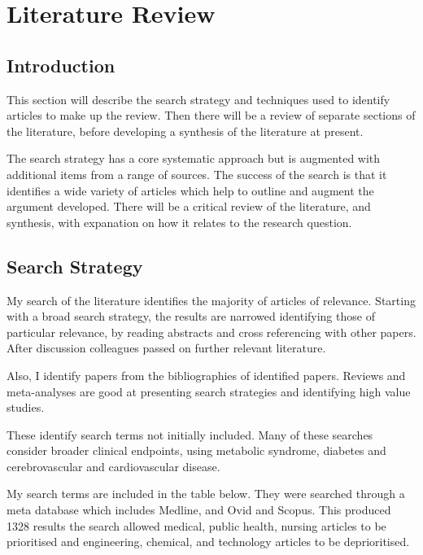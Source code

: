 \documentclass[
]{article}
\begin{document}
\newpage

\hypertarget{literature-review}{%
\section{Literature Review}\label{literature-review}}

\hypertarget{introduction-1}{%
\subsection{Introduction}\label{introduction-1}}

This section will describe the search strategy and techniques used to
identify articles to make up the review. Then there will be a review of
separate sections of the literature, before developing a synthesis of
the literature at present.

The search strategy has a core systematic approach but is augmented with
additional items from a range of sources. The success of the search is
that it identifies a wide variety of articles which help to outline and
augment the argument developed. There will be a critical review of the
literature, and synthesis, with expanation on how it relates to the
research question.

\hypertarget{search-strategy}{%
\subsection{Search Strategy}\label{search-strategy}}

My search of the literature identifies the majority of articles of
relevance. Starting with a broad search strategy, the results are
narrowed identifying those of particular relevance, by reading abstracts
and cross referencing with other papers. After discussion colleagues
passed on further relevant literature.

Also, I identify papers from the bibliographies of identified papers.
Reviews and meta-analyses are good at presenting search strategies and
identifying high value studies.

These identify search terms not initially included. Many of these
searches consider broader clinical endpoints, using metabolic syndrome,
diabetes and cerebrovascular and cardiovascular disease.

My search terms are included in the table below. They were searched
through a meta database which includes Medline, and Ovid and Scopus.
This produced 1328 results the search allowed medical, public health,
nursing articles to be prioritised and engineering, chemical, and
technology articles to be deprioritised.
\end{document}
